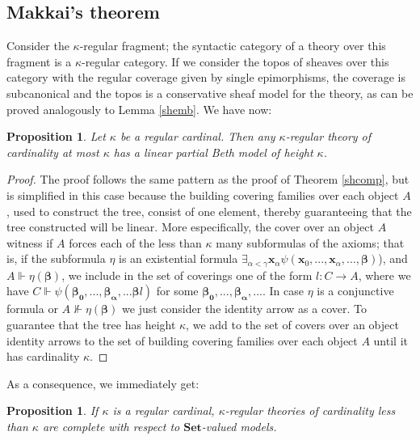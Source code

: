 \documentclass[a4paper,11pt]{article}
\theoremstyle{plain}
\newtheorem{proposition}[thm]{Proposition}
\theoremstyle{plain}
\theoremstyle{remark}
\newcommand{\Sets}{\ensuremath{\mathbf{Set}}}
\begin{document}
\subsection{Makkai's theorem}

Consider the $\kappa$-regular fragment; the syntactic category of a theory over this fragment is a $\kappa$-regular category. If we consider the topos of sheaves over this category with the regular coverage given by single epimorphisms, the coverage is subcanonical and the topos is a conservative sheaf model for the theory, as can be proved analogously to Lemma \ref{shemb}. We have now:

\begin{proposition}
 Let $\kappa$ be a regular cardinal. Then any $\kappa$-regular theory of cardinality at most $\kappa$ has a linear partial Beth model of height $\kappa$.
\end{proposition}

\begin{proof}
The proof follows the same pattern as the proof of Theorem \ref{shcomp}, but is simplified in this case because the building covering families over each object $A$, used to construct the tree, consist of one element, thereby guaranteeing that the tree constructed will be linear. More especifically, the cover over an object $A$ witness if $A$ forces each of the less than $\kappa$ many subformulas of the axioms; that is, if the subformula $\eta$ is an existential formula $\exists_{\alpha<\gamma}\mathbf{x}_{\alpha}\psi(\mathbf{x}_0, ...,\mathbf{x}_{\alpha}, ..., \boldsymbol{\beta})$), and $A \Vdash \eta(\boldsymbol{\beta})$, we include in the set of coverings one of the form $l: C \to A$, where we have $C \Vdash \psi(\boldsymbol{\beta_0}, ..., \boldsymbol{\beta_{\alpha}}, ... \boldsymbol{\beta} l)$ for some $\boldsymbol{\beta_0}, ..., \boldsymbol{\beta_{\alpha}}, ...$. In case $\eta$ is a conjunctive formula or $A \nVdash \eta(\boldsymbol{\beta})$ we just consider the identity arrow as a cover. To guarantee that the tree has height $\kappa$, we add to the set of covers over an object identity arrows to the set of building covering families over each object $A$ until it has cardinality $\kappa$. 
\end{proof}
 
As a consequence, we immediately get:

\begin{proposition}\label{regbcomp}
If $\kappa$ is a regular cardinal, $\kappa$-regular theories of cardinality less than $\kappa$ are complete with respect to \Sets-valued models. 
\end{proposition}
\end{document}
